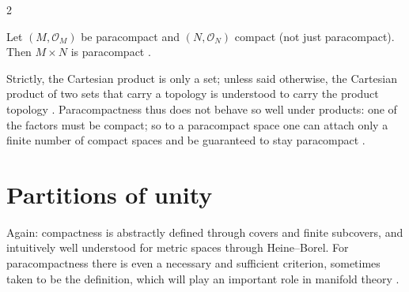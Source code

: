 \begin{paracol}{2}
\begin{theorem}\label{thm:iv-para-prod}
Let $(M,\mathcal O_M)$ be paracompact and $(N,\mathcal O_N)$ compact (not just paracompact). Then $M\times N$ is paracompact .
\end{theorem}
Strictly, the Cartesian product is only a set; unless said otherwise, the Cartesian product of two sets that carry a topology is understood to carry the product topology
. Paracompactness thus does not behave so well under products: one of the factors must be compact; so to a paracompact space one can
attach only a finite number of compact spaces and be guaranteed to stay paracompact .

\section{Partitions of unity}\label{sec:iv-pou}

Again: compactness is abstractly defined through covers and finite subcovers, and intuitively well understood for metric spaces through Heine--Borel. For paracompactness there is even a
necessary and sufficient criterion, sometimes taken to be the definition, which will play an important role in manifold theory .


\end{paracol}
